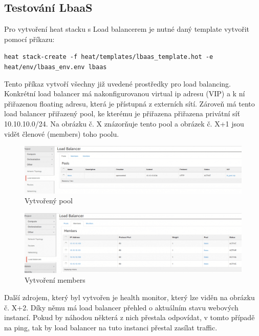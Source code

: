 \subsection{Testování LbaaS}\label{sub:interaction}

Pro vytvoření heat stacku s Load balancerem je nutné daný template vytvořit pomocí příkazu:

\verb!heat stack-create -f heat/templates/lbaas_template.hot -e heat/env/lbaas_env.env lbaas!

Tento příkaz vytvoří všechny již uvedené prostředky pro load balancing. Konkrétní load balancer má nakonfigurovanou virtual ip adresu (VIP) a k ní přiřazenou floating adresu, která je přístupná z externích sítí. Zároveň má tento load balancer přiřazený pool, ke kterému je přiřazena přiřazena privátní síť 10.10.10.0/24. Na obrázku č. X znázorňuje tento pool a obrázek č. X+1 jsou vidět členové (members) toho poolu.

\begin{figure}[h]
\begin{centering}
\includegraphics[scale=0.45]{images/lbaas1}
\par\end{centering}
\caption{Vytvořený pool\label{fig:lbaas1}}
\end{figure}

\begin{figure}[h]
\begin{centering}
\includegraphics[scale=0.45]{images/lbaas2}
\par\end{centering}
\caption{Vytvoření members\label{fig:lbaas2}}
\end{figure}

Další zdrojem, který byl vytvořen je health monitor, který lze viděn na obrázku č. X+2. Díky němu má load balancer přehled o aktuálním stavu webových instancí. Pokud by náhodou některá z nich přestala odpovídat, v tomto případě na ping, tak by load balancer na tuto instanci přestal zasílat traffic.

